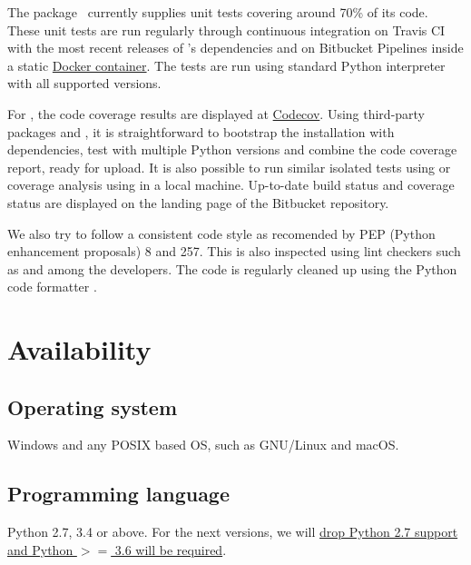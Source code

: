 The package \fluiddyn\ currently supplies unit tests covering around 70\% of its
code.  These unit tests are run regularly through continuous integration on Travis
CI with the most recent releases of \fluiddyn's dependencies and on Bitbucket
Pipelines inside a static \href{https://hub.docker.com/u/fluiddyn}{Docker
container}.  The tests are run using standard Python interpreter with all
supported versions.

For \fluiddyn, the code coverage results are displayed at
\href{https://codecov.io/bb/fluiddyn/fluiddyn}{Codecov}.  Using third-party
packages  and , it is straightforward to bootstrap the
installation with dependencies, test with multiple Python versions and combine the
code coverage report, ready for upload. It is also possible to run similar
isolated tests using  or coverage analysis using  in a
local machine.  Up-to-date build status and coverage status are displayed on the
landing page of the Bitbucket repository.

We also try to follow a consistent code style as recomended by PEP (Python
enhancement proposals) 8 and 257. This is also inspected using lint checkers
such as  and  among the developers.  The
code is regularly cleaned up using the Python code formatter .

\section{Availability}
\vspace{0.5cm}
\subsection{Operating system}


Windows and any POSIX based OS, such as GNU/Linux and macOS.

\subsection{Programming language}


Python 2.7, 3.4 or above. For the next versions, we will
\href{https://python3statement.org/}{drop Python 2.7 support and Python $>=$
3.6 will be required}.

